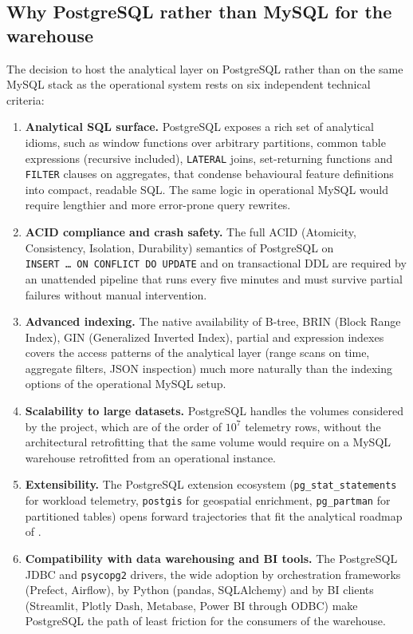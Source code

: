\subsection{Why PostgreSQL rather than MySQL for the warehouse}
\label{ssec:why-postgres}
The decision to host the analytical layer on PostgreSQL rather than on the same MySQL stack as the operational system rests on six independent technical criteria:

\begin{enumerate}
    \item \textbf{Analytical SQL surface.} PostgreSQL exposes a rich set of analytical idioms, such as window functions over arbitrary partitions, common table expressions (recursive included), \texttt{LATERAL} joins, set-returning functions and \texttt{FILTER} clauses on aggregates, that condense behavioural feature definitions into compact, readable SQL. The same logic in operational MySQL would require lengthier and more error-prone query rewrites.
    \item \textbf{ACID compliance and crash safety.} The full ACID (Atomicity, Consistency, Isolation, Durability) semantics of PostgreSQL on \texttt{INSERT~\dots~ON~CONFLICT~DO~UPDATE} and on transactional DDL are required by an unattended pipeline that runs every five minutes and must survive partial failures without manual intervention.
    \item \textbf{Advanced indexing.} The native availability of B-tree, BRIN (Block Range Index), GIN (Generalized Inverted Index), partial and expression indexes covers the access patterns of the analytical layer (range scans on time, aggregate filters, JSON inspection) much more naturally than the indexing options of the operational MySQL setup.
    \item \textbf{Scalability to large datasets.} PostgreSQL handles the volumes considered by the project, which are of the order of \(10^7\) telemetry rows, without the architectural retrofitting that the same volume would require on a MySQL warehouse retrofitted from an operational instance.
    \item \textbf{Extensibility.} The PostgreSQL extension ecosystem (\texttt{pg\_stat\_statements} for workload telemetry, \texttt{postgis} for geospatial enrichment, \texttt{pg\_partman} for partitioned tables) opens forward trajectories that fit the analytical roadmap of \hostorg{}.
    \item \textbf{Compatibility with data warehousing and BI tools.} The PostgreSQL JDBC and \texttt{psycopg2} drivers, the wide adoption by orchestration frameworks (Prefect, Airflow), by Python (pandas, SQLAlchemy) and by BI clients (Streamlit, Plotly Dash, Metabase, Power BI through ODBC) make PostgreSQL the path of least friction for the consumers of the warehouse.
\end{enumerate}

